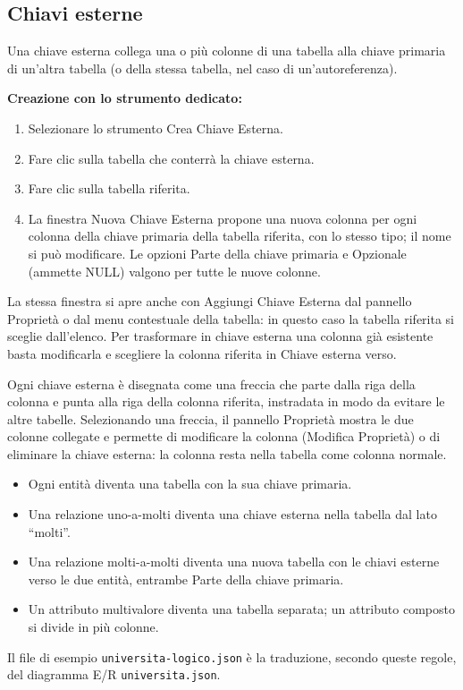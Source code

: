 \documentclass[a4paper,11pt]{article}
\newcommand\mediumweight{\fontseries{mb}\selectfont}
\newcommand\uielement[1]{{\mediumweight #1}}
\begin{document}
\subsection{Chiavi esterne}

Una chiave esterna collega una o più colonne di una tabella alla chiave primaria di un'altra
tabella (o della stessa tabella, nel caso di un'autoreferenza).

\textbf{Creazione con lo strumento dedicato:}
\begin{enumerate}
  \item Selezionare lo strumento \uielement{Crea Chiave Esterna}.
  \item Fare clic sulla tabella che conterrà la chiave esterna.
  \item Fare clic sulla tabella riferita.
  \item La finestra \uielement{Nuova Chiave Esterna} propone una nuova colonna per ogni colonna
        della chiave primaria della tabella riferita, con lo stesso tipo; il nome si può
        modificare. Le opzioni \uielement{Parte della chiave primaria} e
        \uielement{Opzionale (ammette NULL)} valgono per tutte le nuove colonne.
\end{enumerate}

La stessa finestra si apre anche con \uielement{Aggiungi Chiave Esterna} dal pannello Proprietà o
dal menu contestuale della tabella: in questo caso la tabella riferita si sceglie dall'elenco.
Per trasformare in chiave esterna una colonna già esistente basta modificarla e scegliere la
colonna riferita in \uielement{Chiave esterna verso}.

Ogni chiave esterna è disegnata come una freccia che parte dalla riga della colonna e punta alla
riga della colonna riferita, instradata in modo da evitare le altre tabelle. Selezionando una
freccia, il pannello Proprietà mostra le due colonne collegate e permette di modificare la
colonna (\uielement{Modifica Proprietà}) o di eliminare la chiave esterna: la colonna resta nella
tabella come colonna normale.

\begin{tcolorbox}[tipbox, title={Dallo schema E/R allo schema logico}]
  \begin{itemize}
    \item Ogni entità diventa una tabella con la sua chiave primaria.
    \item Una relazione uno-a-molti diventa una chiave esterna nella tabella dal lato ``molti''.
    \item Una relazione molti-a-molti diventa una nuova tabella con le chiavi esterne verso le
          due entità, entrambe \uielement{Parte della chiave primaria}.
    \item Un attributo multivalore diventa una tabella separata; un attributo composto si divide
          in più colonne.
  \end{itemize}
  Il file di esempio \texttt{universita-logico.json} è la traduzione, secondo queste regole, del
  diagramma E/R \texttt{universita.json}.
\end{tcolorbox}
\end{document}
